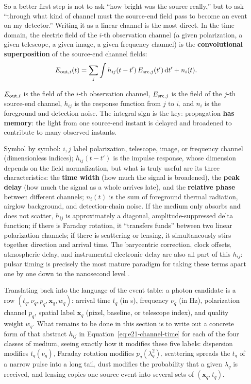 So a better first step is not to ask ``how bright was the source really,'' but to ask ``through what kind of channel must the source-end field pass to become an event on my detector.'' Writing it as a linear channel is the most direct. In the time domain, the electric field of the \(i\)-th observation channel (a given polarization, a given telescope, a given image, a given frequency channel) is the \textbf{convolutional superposition} of the source-end channel fields:
\begin{equation}
  E_{{\rm out},i}(t)
  =
  \sum_j\int h_{ij}(t-t')\,E_{{\rm src},j}(t')\,{\rm d}t'
  + n_i(t) .
  \label{eq:e21-channel-time}
\end{equation}
\begin{formulaexplain}
\(E_{{\rm out},i}\) is the field of the \(i\)-th observation channel, \(E_{{\rm src},j}\) is the field of the \(j\)-th source-end channel, \(h_{ij}\) is the response function from \(j\) to \(i\), and \(n_i\) is the foreground and detection noise. The integral sign is the key: propagation \textbf{has memory}: the light from one source-end instant is delayed and broadened to contribute to many observed instants.
\end{formulaexplain}
Symbol by symbol: \(i,j\) label polarization, telescope, image, or frequency channel (dimensionless indices); \(h_{ij}(t-t')\) is the impulse response, whose dimension depends on the field normalization, but what is truly useful are its three characteristics: the \textbf{time width} (how much the signal is broadened), the \textbf{peak delay} (how much the signal as a whole arrives late), and the \textbf{relative phase} between different channels; \(n_i(t)\) is the sum of foreground thermal radiation, airglow background, and detection-chain noise. If the medium only absorbs and does not scatter, \(h_{ij}\) is approximately a diagonal, amplitude-suppressed delta function; if there is Faraday rotation, it ``transfers funds'' between two linear polarization channels; if there is scattering or lensing, it simultaneously stirs together direction and arrival time. The barycentric correction, clock offsets, atmospheric delay, and instrumental electronic delay are also all part of this \(h_{ij}\): pulsar timing is precisely the most mature paradigm for taking these terms apart one by one down to the nanosecond level \citep{2006MNRAS.372.1549E}.

Translating back into the language of the event table: a photon candidate is a row \((t_q,\nu_q,p_q,\bm{x}_q,w_q)\): arrival time \(t_q\) (in s), frequency \(\nu_q\) (in Hz), polarization channel \(p_q\), spatial label \(\bm{x}_q\) (pixel, baseline, or telescope index), and quality weight \(w_q\). What remains to be done in this section is to write out a concrete form of that abstract \(h_{ij}\) in Equation~\eqref{eq:e21-channel-time} for each of the four classes of medium, seeing exactly how it modifies these five labels: dispersion modifies \(t_q(\nu_q)\), Faraday rotation modifies \(p_q(\lambda_q^2)\), scattering spreads the \(t_q\) of a narrow pulse into a long tail, dust modifies the probability that a given \(\lambda_q\) is received, and lensing copies one source event into several sets of \((\bm{x}_q,t_q)\).

